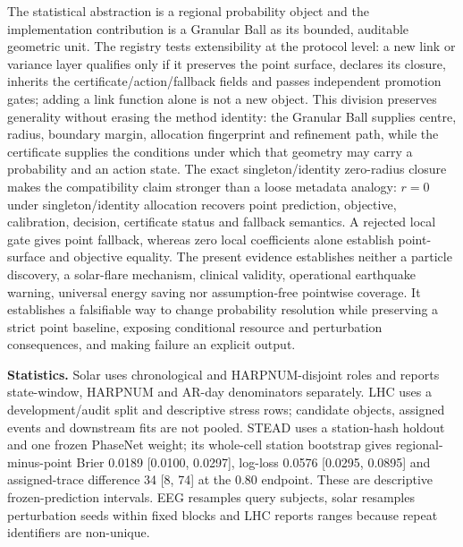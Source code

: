 \documentclass[10pt]{article}
\begin{document}
The statistical abstraction is a regional probability object and the implementation contribution is a Granular Ball as its bounded, auditable geometric unit. The registry tests extensibility at the protocol level: a new link or variance layer qualifies only if it preserves the point surface, declares its closure, inherits the certificate/action/fallback fields and passes independent promotion gates; adding a link function alone is not a new object. This division preserves generality without erasing the method identity: the Granular Ball supplies centre, radius, boundary margin, allocation fingerprint and refinement path, while the certificate supplies the conditions under which that geometry may carry a probability and an action state. The exact singleton/identity zero-radius closure makes the compatibility claim stronger than a loose metadata analogy: $r=0$ under singleton/identity allocation recovers point prediction, objective, calibration, decision, certificate status and fallback semantics. A rejected local gate gives point fallback, whereas zero local coefficients alone establish point-surface and objective equality. The present evidence establishes neither a particle discovery, a solar-flare mechanism, clinical validity, operational earthquake warning, universal energy saving nor assumption-free pointwise coverage. It establishes a falsifiable way to change probability resolution while preserving a strict point baseline, exposing conditional resource and perturbation consequences, and making failure an explicit output.

\textbf{Statistics.} Solar uses chronological and HARPNUM-disjoint roles and reports state-window, HARPNUM and AR-day denominators separately. LHC uses a development/audit split and descriptive stress rows; candidate objects, assigned events and downstream fits are not pooled. STEAD uses a station-hash holdout and one frozen PhaseNet weight; its whole-cell station bootstrap gives regional-minus-point Brier 0.0189 [0.0100, 0.0297], log-loss 0.0576 [0.0295, 0.0895] and assigned-trace difference 34 [8, 74] at the 0.80 endpoint. These are descriptive frozen-prediction intervals. EEG resamples query subjects, solar resamples perturbation seeds within fixed blocks and LHC reports ranges because repeat identifiers are non-unique.
\end{document}
